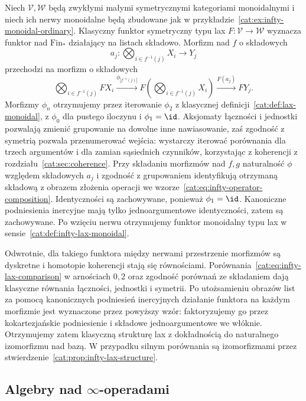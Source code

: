 \begin{przyklad}\label{cat:ex:infty-lax-ordinary}
Niech $\mathcal V,\mathcal W$ będą zwykłymi małymi symetrycznymi kategoriami monoidalnymi i niech ich nerwy monoidalne będą zbudowane jak w przykładzie~\ref{cat:ex:infty-monoidal-ordinary}. Klasyczny funktor symetryczny typu lax $F:\mathcal V\to\mathcal W$ wyznacza funktor nad $\mathrm{Fin}_*$ działający na listach składowo. Morfizm nad $f$ o składowych
\[
 a_j:\bigotimes_{i\in f^{-1}(j)} X_i\longrightarrow Y_j
\]
przechodzi na morfizm o składowych
\[
 \bigotimes_{i\in f^{-1}(j)} FX_i
 \xrightarrow{\phi_{|f^{-1}(j)|}}
 F\left(\bigotimes_{i\in f^{-1}(j)}X_i\right)
 \xrightarrow{F(a_j)} FY_j.
\]
Morfizmy $\phi_n$ otrzymujemy przez iterowanie $\phi_2$ z klasycznej definicji~\ref{cat:def:lax-monoidal}, z $\phi_0$ dla pustego iloczynu i $\phi_1=\id$. Aksjomaty łączności i jednostki pozwalają zmienić grupowanie na dowolne inne nawiasowanie, zaś zgodność z symetrią pozwala przenumerować wejścia: wystarczy iterować porównania dla trzech argumentów i dla zamian sąsiednich czynników, korzystając z koherencji z rozdziału~\ref{cat:sec:coherence}. Przy składaniu morfizmów nad $f,g$ naturalność $\phi$ względem składowych $a_j$ i zgodność z grupowaniem identyfikują otrzymaną składową z obrazem złożenia operacji we wzorze~\eqref{cat:eq:infty-operator-composition}. Identyczności są zachowywane, ponieważ $\phi_1=\id$. Kanoniczne podniesienia inercyjne mają tylko jednoargumentowe identyczności, zatem są zachowywane. Po wzięciu nerwu otrzymujemy funktor monoidalny typu lax w sensie~\ref{cat:def:infty-lax-monoidal}.

Odwrotnie, dla takiego funktora między nerwami przestrzenie morfizmów są dyskretne i homotopie koherencji stają się równościami. Porównania~\eqref{cat:eq:infty-lax-comparison} w arnościach $0,2$ oraz zgodność porównań ze składaniem dają klasyczne równania łączności, jednostki i symetrii. Po utożsamieniu obrazów list za pomocą kanonicznych podniesień inercyjnych działanie funktora na każdym morfizmie jest wyznaczone przez powyższy wzór: faktoryzujemy go przez kokartezjańskie podniesienie i składowe jednoargumentowe we włóknie. Otrzymujemy zatem klasyczną strukturę lax z dokładnością do naturalnego izomorfizmu nad bazą. W przypadku silnym porównania są izomorfizmami przez stwierdzenie~\ref{cat:prop:infty-lax-structure}.
\end{przyklad}

\subsection{Algebry nad \texorpdfstring{$\infty$-operadami}{operadami wyższymi}}

